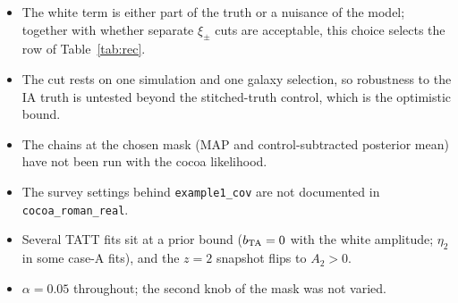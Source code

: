\documentclass[11pt]{article}
\begin{document}
\begin{itemize}
  \item The white term is either part of the truth or a nuisance of the
    model; together with whether separate $\xi_\pm$ cuts are acceptable,
    this choice selects the row of Table~\ref{tab:rec}.
  \item The cut rests on one simulation and one galaxy selection, so
    robustness to the IA truth is untested beyond the stitched-truth
    control, which is the optimistic bound.
  \item The chains at the chosen mask (MAP and control-subtracted
    posterior mean) have not been run with the cocoa likelihood.
  \item The survey settings behind \texttt{example1\_cov} are not
    documented in \texttt{cocoa\_roman\_real}.
  \item Several TATT fits sit at a prior bound ($b_{\rm TA} = 0$ with the
    white amplitude; $\eta_2$ in some case-A fits), and the $z = 2$
    snapshot flips to $A_2 > 0$.
  \item $\alpha = 0.05$ throughout; the second knob of the mask was not
    varied.
\end{itemize}
\end{document}

